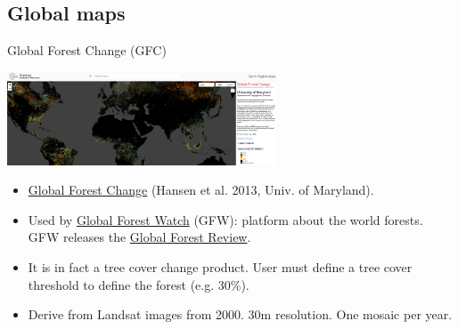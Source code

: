 \documentclass[10pt,table,dvipsnames,compress]{beamer}
\begin{document}
\subsection{Global maps}
\label{sec:org55750df}

\begin{frame}[label={sec:org8341444}]{Global Forest Change (GFC)}
\begin{center}
\includegraphics[width=8cm]{figs/fcc/gfc.png}
\end{center}

\begin{itemize}
\item \href{https://glad.earthengine.app/view/global-forest-change}{Global Forest Change} (Hansen et al. 2013, Univ. of Maryland).
\item Used by \href{https://www.globalforestwatch.org/}{Global Forest Watch} (GFW): platform about the world forests. GFW releases the \href{https://research.wri.org/gfr/global-forest-review}{Global Forest Review}.
\item It is in fact a tree cover change product. User must define a tree cover threshold to define the forest (e.g. 30\%).
\item Derive from Landsat images from 2000. 30m resolution. One mosaic per year.
\end{itemize}
\end{frame}
\end{document}

